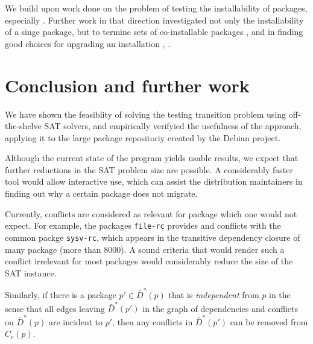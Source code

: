 \documentclass[halfparskip,11pt]{scrartcl}
\begin{document}
We build upon work done on the problem of testing the installability of packages, especially \cite{edos}. Further work in that direction investigated not only the installability of a singe package, but to termine sets of co-installable packages \cite{coinst}, and in finding good choices for upgrading an installation \cite{upgrade}, \cite{apt-pbo}.

%
%
%


\section{Conclusion and further work}

We have shown the feasiblity of solving the testing transition problem using off-the-shelve SAT solvers, and empirically verifyied the usefulness of the approach, applying it to the large package repositoriy created by the Debian project.

Although the current state of the program yields usable results, we expect that further reductions in the SAT problem size are possible. A considerably faster tool would allow interactive use, which can assist the distribution maintainers in finding out why a certain package does not migrate.

Currently, conflicts are considered as relevant for package which one would not expect. For example, the packages \texttt{file-rc} provides and conflicts with the common packge \texttt{sysv-rc}, which appears in the transitive dependency closure of many package (more than 8000). A sound criteria that would render such a conflict irrelevant for most packages would considerably reduce the size of the SAT instance.

Similarly, if there is a package $p'\in \bar D^*(p)$ that is \emph{independent} from $p$ in the sense that all edges leaving $\bar D^*(p')$ in the graph of dependencies and conflicts on $\bar D^*(p)$ are incident to $p'$, then any conflicts in $\bar D^*(p')$ can be removed from $C_r(p)$. 




\end{document}
